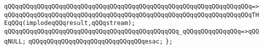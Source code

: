 \verb|qQQqqQQqqQQqqQQqqQQqqQQqqQQqqQQqqQQqqQQqqQQqqQQqqQQqqQQqqQQqqQQqqQQq=>|\newline
\verb|qQQqqQQqqQQqqQQqqQQqqQQqqQQqqQQqqQQqqQQqqQQqqQQqqQQqqQQqqQQqqQQqqQQqTHEqQQq(implodeqQQqresult,qQQqstream);|\newline
\newline
\verb|qQQqqQQqqQQqqQQqqQQqqQQqqQQqqQQqqQQqqQQqqQQqqQQq_qQQqqQQqqQQqqQQq=>qQQqNULL;|\newline
\verb|qQQqqQQqqQQqqQQqqQQqqQQqqQQqqQQqesac;|\newline
\verb|};|\newline
\newline

